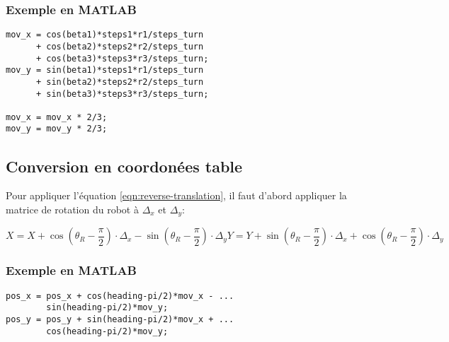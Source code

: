 \documentclass[a4paper]{paper}
\begin{document}
\subsubsection{Exemple en MATLAB}
\begin{lstlisting}
mov_x = cos(beta1)*steps1*r1/steps_turn
      + cos(beta2)*steps2*r2/steps_turn
      + cos(beta3)*steps3*r3/steps_turn;
mov_y = sin(beta1)*steps1*r1/steps_turn
      + sin(beta2)*steps2*r2/steps_turn
      + sin(beta3)*steps3*r3/steps_turn;

mov_x = mov_x * 2/3;
mov_y = mov_y * 2/3;
\end{lstlisting}

\subsection{Conversion en coordonées table}
Pour appliquer l'équation \eqref{eqn:reverse-translation}, il faut d'abord appliquer
la matrice de rotation du robot à $\Delta_x$ et $\Delta_y$:

\begin{subequations}
    \begin{equation}
        X = X + \cos \left( \theta_R - \frac{\pi}{2} \right) \cdot \Delta_x - \sin \left( \theta_R - \frac{\pi}{2} \right) \cdot \Delta_y
    \end{equation}
    \begin{equation} 
        Y = Y + \sin \left( \theta_R - \frac{\pi}{2} \right) \cdot \Delta_x + \cos \left( \theta_R - \frac{\pi}{2} \right) \cdot \Delta_y
    \end{equation} 
    \label{eqn:coordinate-transform}
\end{subequations}

\subsubsection{Exemple en MATLAB}
\begin{lstlisting}
pos_x = pos_x + cos(heading-pi/2)*mov_x - ...
        sin(heading-pi/2)*mov_y;
pos_y = pos_y + sin(heading-pi/2)*mov_x + ...
        cos(heading-pi/2)*mov_y;
\end{lstlisting}
\end{document}
